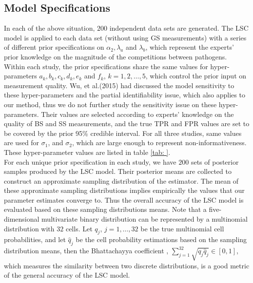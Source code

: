 \documentclass[11 pt, a4paper]{article}  %
\begin{document}
\subsection{Model Specifications}
In each of the above situation, $200$ independent data sets are generated. The LSC model is applied to each data set (without using GS measurements) with a series of different prior specifications on $\alpha_2, \lambda_a$ and $\lambda_b$, which represent the experts' prior knowledge on the magnitude of the competitions between pathogens. Within each study, the prior specifications share the same values for hyper-parameters $a_k, b_k, c_k, d_k, e_k$ and $f_k$, $k = 1, 2, \ldots, 5$, which control the prior input on measurement quality. Wu, et al.(2015) \cite{wu2015partially} had discussed the model sensitivity to these hyper-parameters and the partial identifiability issue, which also applies to our method, thus we do not further study the sensitivity issue on these hyper-parameters. Their values are selected according to experts' knowledge on the quality of BS and SS measurements, and the true TPR and FPR values are set to be covered by the prior 95\% credible interval. For all three studies, same values are used for $\sigma_1$, and $\sigma_2$, which are large enough to represent non-informativeness. These hyper-parameter values are listed in table \ref{tab: }. \\

For each unique prior specification in each study, we have $200$ sets of posterior samples produced by the LSC model. Their posterior means are collected to construct an approximate sampling distribution of the estimator. The mean of these approximate sampling distributions implies empirically the values that our parameter estimates converge to. Thus the overall accuracy of the LSC model is evaluated based on these sampling distributions means. Note that a five-dimensional multivariate binary distribution can be represented by a multinomial distribution with $32$ cells. Let $q_{j}$, $j = 1, \ldots, 32$ be the true multinomial cell probabilities, and let $\hat{q}_j$ be the cell probability estimations based on the sampling distribution means, then the Bhattachayya coefficient \cite{bhattachayya1943measure}, $\sum_{j=1}^{32}\sqrt{q_j \hat{q}_j} \in [0, 1]$, which measures the similarity between two discrete distributions, is a good metric of the general accuracy of the LSC model. \\
\end{document}

